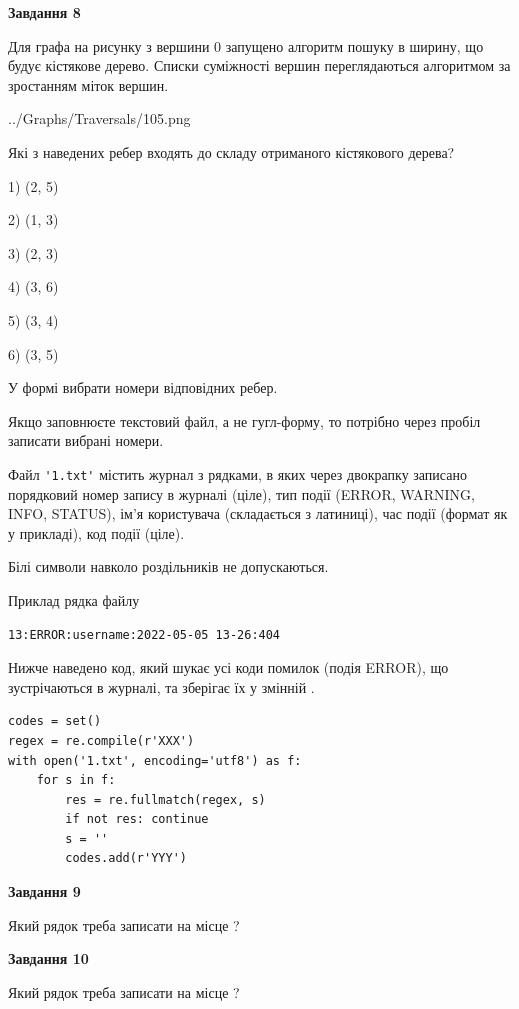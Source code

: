 \documentclass[12pt, ukrainian]{article}
\def\code#1{\Verb!#1!}
\begin{document}
{\begin {large}
{\begin {center}\textbf{Завдання 8}\end {center}}\par
Для графа на рисунку з вершини 0 запущено алгоритм пошуку в ширину, що будує кістякове дерево. Списки суміжності вершин переглядаються алгоритмом за зростанням міток вершин.\par
\begin{center}
	{../Graphs/Traversals/105.png}
\end{center}
\par Які з наведених ребер входять до складу отриманого кістякового дерева?\par
1) (2, 5)\par
2) (1, 3)\par
3) (2, 3)\par
4) (3, 6)\par
5) (3, 4)\par
6) (3, 5)\par
{\vskip 15pt} У формі вибрати номери відповідних ребер.


Якщо заповнюєте текстовий файл, а не гугл-форму, то потрібно через пробіл записа\-ти вибрані номери.\par
\newpage


Файл \code{'1.txt'} містить журнал з рядками, в яких через двокрапку записано поряд\-ко\-вий номер запису в журналі (ціле), тип події (ERROR, WARNING, INFO, STATUS), ім'я користувача (складається з латиниці), час події (фор\-мат як у прикладі), код події (ціле).

Білі символи навколо роздільників не допускаються.

Приклад рядка файлу



\begin{verbatim}
13:ERROR:username:2022-05-05 13-26:404
\end{verbatim}


Нижче наведено код, який шукає усі коди помилок (подія ERROR), що зустріча\-ють\-ся в журналі, та зберігає їх у змінній .



\begin{verbatim}
codes = set()
regex = re.compile(r'XXX')
with open('1.txt', encoding='utf8') as f:
    for s in f:
        res = re.fullmatch(regex, s)
        if not res: continue
        s = ''
        codes.add(r'YYY')
\end{verbatim}


{\begin {center}\textbf{Завдання 9}\end {center}}\par
Який рядок треба записати на місце  ?\par
\vspace{5mm}


{\begin {center}\textbf{Завдання 10}\end {center}}\par
Який рядок треба записати на місце  ?\par


\newpage


\end {large}}
\end{document}
